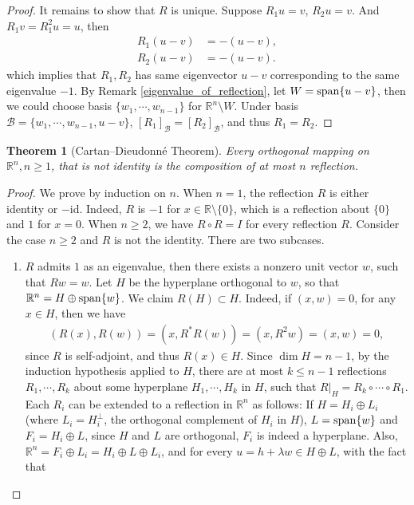 \documentclass[11pt]{book}
\newtheorem{theorem}{Theorem}[section]
\theoremstyle{definition}
\numberwithin{equation}{chapter}
\begin{document}
\begin{subappendices}
\begin{proof}
It remains to show that $R$ is unique. Suppose $R_1 u = v$, $R_2 u = v$. And $R_1 v = R_1^2 u = u$, then 
\begin{align*}
    R_1 (u-v) & = - (u-v), \\
    R_2 (u-v) & = - (u-v).
\end{align*}
which implies that $R_1, R_2$ has same eigenvector $u - v$ corresponding to the same eigenvalue $-1$. By Remark \ref{eigenvalue_of_reflection}, let $W = {\rm span}\{u-v\}$, then we could choose basis $\{w_1, \cdots, w_{n-1}\}$ for $\mathbb{R}^n \setminus W$. Under basis $\mathcal{B} = \{w_1, \cdots, w_{n-1}, u-v\}$, $[R_1]_{\mathcal{B}} = [R_2]_{\mathcal{B}}$, and thus $R_1 = R_2$.
\end{proof}

\medskip

\begin{theorem}[Cartan–Dieudonné Theorem]{\bf \cite{35}} \label{Cartan_Dieudonne}
Every orthogonal mapping on $\mathbb{R}^n, n \geq 1$, that is not identity is the composition of at most $n$ reflection.
\end{theorem}
\begin{proof}
We prove by induction on $n$. When $n = 1$, the reflection $R$ is either identity or $-$id. Indeed, $R$ is $-1$ for $x \in \mathbb{R} \setminus \{0\}$, which is a reflection about $\{0\}$ and $1$ for $x = 0$. When $n \geq 2$, we have $R \circ R = I$ for every reflection $R$. Consider the case $n \geq 2$ and $R$ is not the identity. There are two subcases.
\begin{enumerate}[label=(\alph*)]
    \item $R$ admits $1$ as an eigenvalue, then there exists a nonzero unit vector $w$, such that $Rw = w$. Let $H$ be the hyperplane orthogonal to $w$, so that $\mathbb{R}^n = H \oplus {\rm span}\{w\}$. We claim $R(H) \subset H$. Indeed, if $(x, w) = 0$, for any $x \in H$, then we have 
    \begin{align*}
        (R(x), R(w)) = (x, R^* R(w)) = (x, R^2 w) = (x, w) = 0,
    \end{align*}
    since $R$ is self-adjoint, and thus $R(x) \in H$. Since $\dim H = n - 1$, by the induction hypothesis applied to $H$, there are at most $k \leq n - 1$ reflections $R_1, \cdots, R_k$ about some hyperplane $H_1, \cdots, H_k$ in $H$, such that $R|_H = R_k \circ \cdots \circ R_1$. Each $R_i$ can be extended to a reflection in $\mathbb{R}^n$ as follows: If $H = H_i \oplus L_i$ (where $L_i = H_i^\bot$, the orthogonal complement of $H_i$ in $H$), $L = {\rm span}\{w\}$ and $F_i = H_i \oplus L$, since $H$ and $L$ are orthogonal, $F_i$ is indeed a hyperplane. Also, $\mathbb{R}^n = F_i \oplus L_i = H_i \oplus L \oplus L_i$, and for every $u = h + \lambda w \in H \oplus L$, with the fact that

\end{enumerate}
\end{proof}
\end{subappendices}
\end{document}
